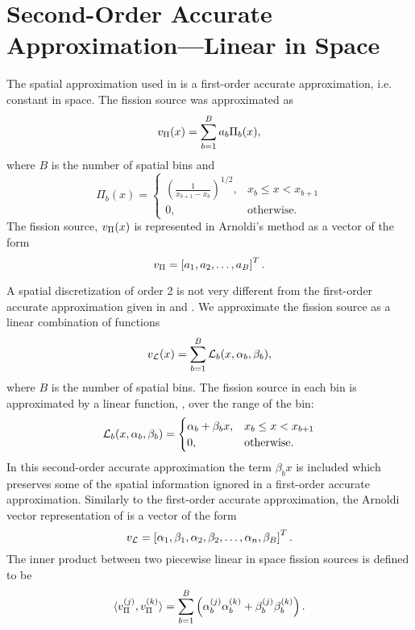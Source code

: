 \section{Second-Order Accurate Approximation---Linear in Space  \label{sec:LinearSpace}}
The spatial approximation used in  is a first-order accurate approximation, i.e. constant in space.  The fission source was approximated as
\begin{equation}
    v_{\Pi}(x) = \sum_{b=1}^B a_b \Pi_b(x),
    \label{eq:ApproximatedSource}
\end{equation}
where $B$ is the number of spatial bins and 
\begin{equation}
    \Pi_b(x) = \begin{cases}
        \left(\frac{1}{x_{b+1}-x_b}\right)^{1/2}, & x_b \leq x < x_{b+1} \\
        0, & \mathrm{otherwise}.
    \end{cases}
    \label{eq:FirstOrderApproximation}
\end{equation}
The fission source, $v_{\Pi}(x)$ is represented in Arnoldi's method as a vector of the form
\begin{equation}
    v_{\Pi} = \left[a_1, a_2, \ldots, a_B\right]^T.
    \label{eq:ConstantSpaceArnoldiVector}
\end{equation}

A spatial discretization of order 2 is not very different from the first-order accurate approximation given in  and .  We approximate the fission source as a linear combination of functions
\begin{equation}
    v_{\mathcal{L}}(x) = \sum_{b=1}^B \mathcal{L}_b(x, \alpha_b, \beta_b),
    \label{eq:LinearSource}
\end{equation}
where $B$ is the number of spatial bins.  The fission source in each bin is approximated by a linear function, \Lx, over the range of the bin:
\begin{equation}
    \mathcal{L}_b(x, \alpha_b, \beta_b) = \begin{cases}
        \alpha_b + \beta_b x, & x_b \leq x < x_{b+1} \\
        0, & \mathrm{otherwise}.
    \end{cases}
    \label{eq:SecondOrderApproximation}
\end{equation}
In this second-order accurate approximation the term $\beta_b x$ is included which preserves some of the spatial information ignored in a first-order accurate approximation.  Similarly to the first-order accurate approximation, the Arnoldi vector representation of \vL{} is a vector of the form
\begin{equation}
    v_{\mathcal{L}} = \left[\alpha_1, \beta_1, \alpha_2, \beta_2, \ldots, \alpha_n, \beta_B\right]^T.
    \label{eq:LinearSpaceArnoldiVector}
\end{equation}
The inner product between two piecewise linear in space fission sources is defined to be
\begin{equation}
    \langle v_{\Pi}^{(j)},v_{\Pi}^{(k)}\rangle = \sum_{b=1}^B \left(\alpha_b^{(j)}\alpha_b^{(k)} + \beta_b^{(j)}\beta_b^{(k)} \right).
    \label{eq:InnerProductLinearSources}
\end{equation}

